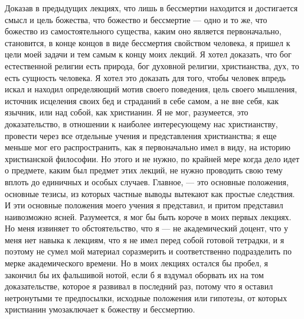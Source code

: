 \documentclass[12pt]{article}
\begin{document}
Доказав в предыдущих лекциях, что лишь в бессмертии находится и достигается смысл и цель божества, что божество и бессмертие --- одно и то же, что божество из самостоятельного существа, каким оно является первоначально, становится, в конце концов в виде бессмертия свойством человека, я пришел к цели моей задачи и тем самым к концу моих лекций. Я хотел доказать, что бог естественной религии есть природа, бог духовной религии, христианства, дух, то есть сущность человека. Я хотел это доказать для того, чтобы человек впредь искал и находил определяющий мотив своего поведения, цель своего мышления, источник исцеления своих бед и страданий в себе самом, а не вне себя, как язычник, или над собой, как христианин. Я не мог, разумеется, это доказательство, в отношении к наиболее интересующему нас христианству, провести через все отдельные учения и представления христианства; я еще меньше мог его распространить, как я первоначально имел в виду, на историю христианской философии. Но этого и не нужно, по крайней мере когда дело идет о предмете, каким был предмет этих лекций, не нужно проводить свою тему вплоть до единичных и особых случаев. Главное, --- это основные положения, основные тезисы, из которых частные выводы вытекают как простые следствия. И эти основные положения моего учения я представил, и притом представил наивозможно ясней. Разумеется, я мог бы быть короче в моих первых лекциях. Но меня извиняет то обстоятельство, что я --- не академический доцент, что у меня нет навыка к лекциям, что я не имел перед собой готовой тетрадки, и я поэтому не сумел мой материал соразмерить и соответственно подразделить по мерке академического времени. Но в моих лекциях остался бы пробел, я закончил бы их фальшивой нотой, если б я вздумал оборвать их на том доказательстве, которое я развивал в последний раз, потому что я оставил нетронутыми те предпосылки, исходные положения или гипотезы, от которых христианин умозаключает к божеству и бессмертию. 
\end{document}
